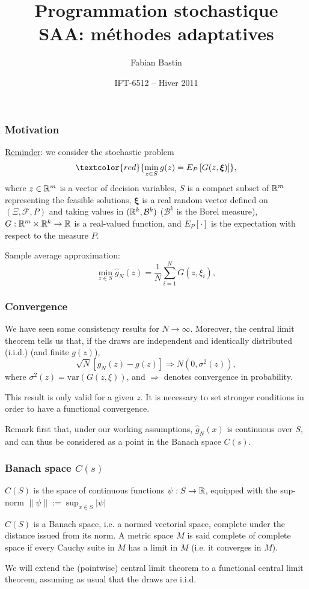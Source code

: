\documentclass{beamer}
\title[Adaptive methods]{Programmation stochastique\\SAA: méthodes adaptatives}
\author{Fabian Bastin}
\date{IFT-6512 -- Hiver 2011}
\def\bxi{\boldsymbol\xi}
\begin{document}
\frame{\titlepage}

\begin{frame}
\frametitle{Motivation}

\underline{Reminder}: we consider the stochastic problem
\[
\textcolor{red}{\min_{z \in S} g(z) = E_P \left[ G(z, \bxi) \right]},
\]
where $z \in \mathbb{R}^m$ is a vector of decision variables, $S$ is a compact subset of $\mathbb{R}^m$ representing the feasible solutions, $\bxi$ is a real random vector defined on $( \Xi, \mathcal{F}, P )$ and taking values in $( \mathbb{R}^k, \mathcal{B}^k )$ ($\mathcal{B}^k$ is the Borel measure), $G: \mathbb{R}^m \times \mathbb{R}^k \rightarrow \mathbb{R}$ is a real-valued function, and $E_P[\cdot]$ is the expectation with respect to the measure $P$.

\mbox{}

Sample average approximation:
\[
\min_{z \in S} \hat{g}_N(z) = \frac{1}{N} \sum_{i = 1}^N G (z, \xi_i),
\]

\end{frame}

\begin{frame}
\frametitle{Convergence}

We have seen some consistency results for $N \rightarrow \infty$.
Moreover, the central limit theorem tells us that, if the draws are independent and identically distributed (i.i.d.) (and finite $g(z)$),
\[
\sqrt{N} [ \hat{g}_N(z) - g(z) ] \Rightarrow N(0, \sigma^2(z)),
\]
where $\sigma^2(z) = \mbox{var}(G(z,\xi))$, and $\Rightarrow$ denotes convergence in probability.

\mbox{}

This result is only valid for a given $z$.
It is necessary to set stronger conditions in order to have a functional convergence.

\mbox{}

Remark first that, under our working assumptions, $\hat{g}_N(x)$ is continuous over $S$, and can thus be considered as a point in the Banach space $C(s)$.

\end{frame}

\begin{frame}
\frametitle{Banach space $C(s)$}

$C(S)$ is the space of continuous functions $\psi: S \rightarrow \mathbb{R}$,
equipped with the sup-norm $\| \psi \| := \sup_{x \in S}| \psi |$

\mbox{}

$C(S)$ is a Banach space, i.e. a normed vectorial space, complete under the distance issued from its norm.
A metric space $M$ is said complete of complete space if every Cauchy suite in $M$ has a limit in $M$ (i.e. it converges in $M$).

\mbox{}

We will extend the (pointwise) central limit theorem to a functional central limit theorem, assuming as usual that the draws are i.i.d.

\end{frame}
\end{document}
